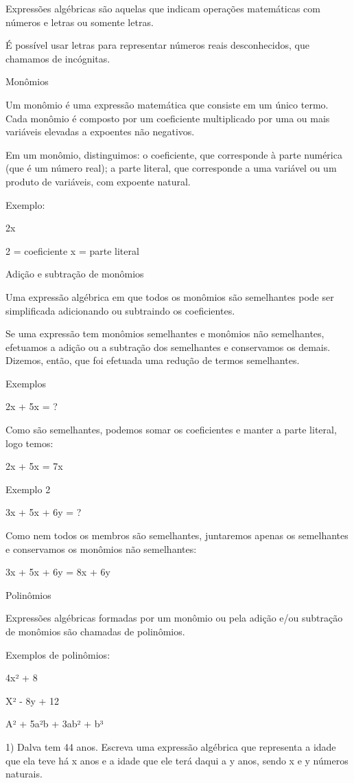 Expressões algébricas são aquelas que indicam operações matemáticas com
números e letras ou somente letras.

É possível usar letras para representar números reais desconhecidos, que
chamamos de incógnitas.

Monômios

Um monômio é uma expressão matemática que consiste em um único termo.
Cada monômio é composto por um coeficiente multiplicado por uma ou mais
variáveis elevadas a expoentes não negativos.

Em um monômio, distinguimos: o coeficiente, que corresponde à parte
numérica (que é um número real); a parte literal, que corresponde a uma
variável ou um produto de variáveis, com expoente natural.

Exemplo:

2x

2 = coeficiente x = parte literal

Adição e subtração de monômios

Uma expressão algébrica em que todos os monômios são semelhantes pode
ser simplificada adicionando ou subtraindo os coeficientes.

Se uma expressão tem monômios semelhantes e monômios não semelhantes,
efetuamos a adição ou a subtração dos semelhantes e conservamos os
demais. Dizemos, então, que foi efetuada uma redução de termos
semelhantes.

Exemplos

2x + 5x = ?

Como são semelhantes, podemos somar os coeficientes e manter a parte
literal, logo temos:

2x + 5x = 7x

Exemplo 2

3x + 5x + 6y = ?

Como nem todos os membros são semelhantes, juntaremos apenas os
semelhantes e conservamos os monômios não semelhantes:

3x + 5x + 6y = 8x + 6y

Polinômios

Expressões algébricas formadas por um monômio ou pela adição e/ou
subtração de monômios são chamadas de polinômios.

Exemplos de polinômios:

4x² + 8

X² - 8y + 12

A² + 5a²b + 3ab² + b³


1) Dalva tem 44 anos. Escreva uma expressão algébrica que representa a
idade que ela teve há x anos e a idade que ele terá daqui a y anos,
sendo x e y números naturais.

